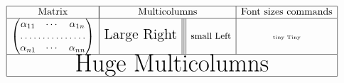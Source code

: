 \documentclass{article}
\begin{document}
\[
  \begin{array}{|c|l|||r|c|}
    \hline
    \text{Matrix}&\multicolumn{2}{|c|}{\text{Multicolumns}}&\text{Font sizes commands}\cr
    \hline
    \begin{pmatrix}
        \alpha_{11}&\cdots&\alpha_{1n}\cr
        \hdotsfor{3}\cr
        \alpha_{n1}&\cdots&\alpha_{nn}
    \end{pmatrix}
    &\Large \text{Large Right}&\small \text{small Left}&\tiny \text{tiny Tiny}\cr
    \hline
    \multicolumn{4}{|c|}{\Huge \text{Huge Multicolumns}}\cr
    \hline
  \end{array}
\]
\end{document}
